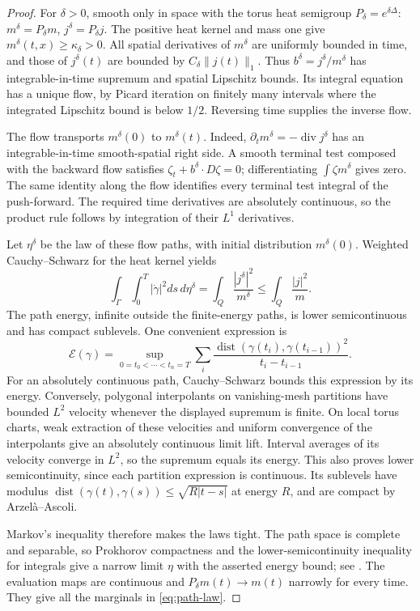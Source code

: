 \documentclass[11pt]{article}
\numberwithin{equation}{section}
\begin{document}
\begin{proof}
For \(\delta>0\), smooth only in space with the torus heat semigroup
\(P_\delta=e^{\delta\Delta}\):
\(m^\delta=P_\delta m\), \(j^\delta=P_\delta j\).
The positive heat kernel and mass one give
\(m^\delta(t,x)\ge\kappa_\delta>0\).
All spatial derivatives of \(m^\delta\) are uniformly bounded in time,
and those of \(j^\delta(t)\) are bounded by
\(C_\delta\|j(t)\|_1\). Thus
\(b^\delta=j^\delta/m^\delta\) has integrable-in-time supremum
and spatial Lipschitz bounds.
Its integral equation has a unique flow, by Picard iteration on finitely
many intervals where the integrated Lipschitz bound is below \(1/2\).
Reversing time supplies the inverse flow.

The flow transports \(m^\delta(0)\) to \(m^\delta(t)\). Indeed,
\(\partial_tm^\delta=-\operatorname{div}j^\delta\) has an
integrable-in-time smooth-spatial right side. A smooth terminal test
composed with the backward flow satisfies
\(\zeta_t+b^\delta\cdot D\zeta=0\); differentiating
\(\int\zeta m^\delta\) gives zero. The same identity along the flow
identifies every terminal test integral of the push-forward.
The required time derivatives are absolutely continuous, so the product
rule follows by integration of their \(L^1\) derivatives.

Let \(\eta^\delta\) be the law of these flow paths, with initial
distribution \(m^\delta(0)\). Weighted Cauchy--Schwarz for the heat
kernel yields
\[
 \int_\Gamma\int_0^T|\dot\gamma|^2ds\,d\eta^\delta
 =\int_Q\frac{|j^\delta|^2}{m^\delta}
 \le\int_Q\frac{|j|^2}{m}.
\]
The path energy, infinite outside the finite-energy paths, is lower
semicontinuous and has compact sublevels. One convenient expression is
\[
 \mathcal E(\gamma)=
 \sup_{0=t_0<\cdots<t_n=T}
 \sum_i\frac{\operatorname{dist}(\gamma(t_i),\gamma(t_{i-1}))^2}
                    {t_i-t_{i-1}} .
\]
For an absolutely continuous path, Cauchy--Schwarz bounds this expression
by its energy. Conversely, polygonal interpolants on vanishing-mesh
partitions have bounded \(L^2\) velocity whenever the displayed supremum
is finite. On local torus charts, weak extraction of these velocities
and uniform convergence of the interpolants give an absolutely continuous
limit lift. Interval averages of its velocity converge in \(L^2\),
so the supremum equals its energy. This also proves lower
semicontinuity, since each partition expression is continuous.
Its sublevels have modulus
\(\operatorname{dist}(\gamma(t),\gamma(s))\le\sqrt{R|t-s|}\)
at energy \(R\), and are compact by Arzel\`a--Ascoli.

Markov's inequality therefore makes the laws tight.
The path space is complete and separable, so Prokhorov compactness
and the lower-semicontinuity inequality for integrals give a narrow
limit \(\eta\) with the asserted energy bound; see
\cite[Appendix~C, Theorems~C.9 and C.12, p.~430 of the author manuscript]{AGZ}.
The evaluation maps are continuous and \(P_\delta m(t)\to m(t)\)
narrowly for every time. They give all the marginals in
\eqref{eq:path-law}.
\end{proof}
\end{document}
